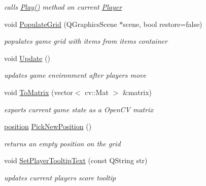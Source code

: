 \begin{DoxyCompactItemize}
\begin{DoxyCompactList}\small\item\em calls \hyperlink{class_game_engine_aafb70dae41903a73df76f638541665f8}{Play()} method on current \hyperlink{class_player}{Player} \end{DoxyCompactList}\item 
void \hyperlink{class_game_engine_a7ebc4fbf00f14a405d989ef7c8d8c1c6}{Populate\+Grid} (Q\+Graphics\+Scene $\ast$scene, bool restore=false)
\begin{DoxyCompactList}\small\item\em populates game grid with items from items container \end{DoxyCompactList}\item 
void \hyperlink{class_game_engine_ae831b6dee7c10ddc3cf5bc5d217031b1}{Update} ()\hypertarget{class_game_engine_ae831b6dee7c10ddc3cf5bc5d217031b1}{}\label{class_game_engine_ae831b6dee7c10ddc3cf5bc5d217031b1}

\begin{DoxyCompactList}\small\item\em updates game environment after player\textquotesingle{}s move \end{DoxyCompactList}\item 
void \hyperlink{class_game_engine_ac3a1cfe6f6278619a1158dad566cd87c}{To\+Matrix} (vector$<$ cv\+::\+Mat $>$ \&matrix)\hypertarget{class_game_engine_ac3a1cfe6f6278619a1158dad566cd87c}{}\label{class_game_engine_ac3a1cfe6f6278619a1158dad566cd87c}

\begin{DoxyCompactList}\small\item\em exports current game state as a Open\+CV matrix \end{DoxyCompactList}\item 
\hyperlink{structposition}{position} \hyperlink{class_game_engine_abd94740b8a8ac3bf474cf695023473ed}{Pick\+New\+Position} ()\hypertarget{class_game_engine_abd94740b8a8ac3bf474cf695023473ed}{}\label{class_game_engine_abd94740b8a8ac3bf474cf695023473ed}

\begin{DoxyCompactList}\small\item\em returns an empty position on the grid \end{DoxyCompactList}\item 
void \hyperlink{class_game_engine_ab6a4193dd629e968bdc3ea8eae259b13}{Set\+Player\+Tooltip\+Text} (const Q\+String str)\hypertarget{class_game_engine_ab6a4193dd629e968bdc3ea8eae259b13}{}\label{class_game_engine_ab6a4193dd629e968bdc3ea8eae259b13}

\begin{DoxyCompactList}\small\item\em updates current player\textquotesingle{}s score tooltip \end{DoxyCompactList}\end{DoxyCompactItemize}
